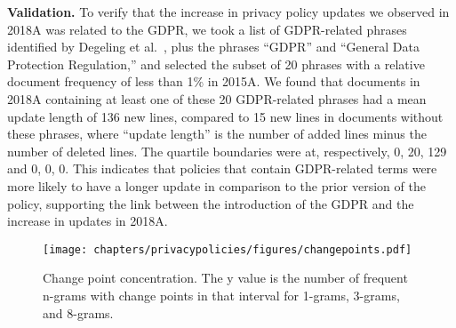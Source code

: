 \textbf{Validation.} To verify that the increase in privacy policy updates we observed in 2018A was related to the GDPR, we took a list of GDPR-related phrases identified by Degeling et al.~\cite{degeling2018we}, plus the phrases “GDPR” and “General Data Protection Regulation,” and selected the subset of 20 phrases with a relative document frequency of less than 1\% in 2015A. We found that documents in 2018A containing at least one of these 20 GDPR-related phrases had a mean update length of 136 new lines, compared to 15 new lines in documents without these phrases, where “update length” is the number of added lines minus the number of deleted lines. The quartile boundaries were at, respectively, 0, 20, 129 and 0, 0, 0. This indicates that policies that contain GDPR-related terms were more likely to have a longer update in comparison to the prior version of the policy, supporting the link between the introduction of the GDPR and the increase in updates in 2018A.

\begin{figure}
    \centering
    \texttt{[image: chapters/privacypolicies/figures/changepoints.pdf]}
    \caption{Change point concentration. The y value is the number of frequent n-grams with change points in that interval for 1-grams, 3-grams, and 8-grams.}
    
    \label{fig:changepoints}
\end{figure}
